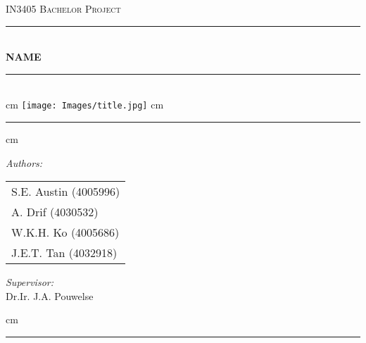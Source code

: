 \documentclass[a4paper]{report}
\begin{document}
\begin{titlepage}
			\begin{center}
			\textsc{\LARGE {IN3405 Bachelor Project}}\\[1cm]
			\rule{\linewidth}{0.5mm} \\[0.4cm]

			{\Huge \bfseries NAME}\\[0.15cm]

			\rule{\linewidth}{0.5mm} \\[1.5cm]
			
			 cm
			\texttt{[image: Images/title.jpg]}
			 cm
				\rule{\linewidth}{0.5mm}
			
			 cm
			
			\begin{minipage}{0.4\textwidth}
				\begin{flushleft} \large
					\emph{Authors:}\\
					\begin{tabular}{l}
						S.E. Austin (4005996) \\
						A. Drif (4030532) \\
						W.K.H. Ko (4005686) \\
						J.E.T. Tan (4032918)
					\end{tabular}
				\end{flushleft}
			\end{minipage}
			\hspace{1cm}
			\begin{minipage}{0.4\textwidth}
				\begin{flushright} \large
					\emph{Supervisor:} \\
					Dr.Ir. J.A. Pouwelse
				\end{flushright}
			\end{minipage}
			
			 cm
			
			\rule{\linewidth}{0.5mm}
			\end{center}
\end{titlepage}



\tableofcontents












\printbibliography
\end{document}
